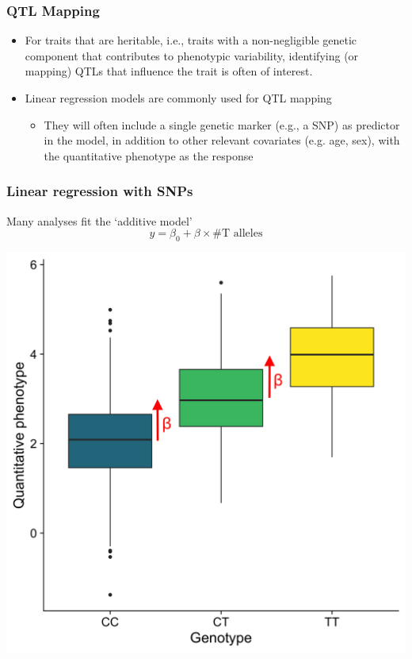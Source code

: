 \documentclass{beamer}
\begin{document}
\begin{frame}
	\frametitle{\bf  QTL Mapping}
	\begin{itemize}
		\item For traits that are heritable, i.e., traits with a non-negligible genetic component that contributes to phenotypic variability, identifying (or mapping) QTLs  that influence the trait is often of interest.
		\item Linear regression models are commonly used for QTL mapping

		\begin{itemize}
		\item They will often include a single genetic marker (e.g., a SNP) as predictor in the model, in addition to other relevant covariates (e.g. age, sex), with the quantitative phenotype as the response
	\end{itemize}

\end{itemize}
\end{frame}


\begin{frame}
	\frametitle{\bf Linear regression with SNPs}
	
	Many analyses fit the `additive model'
	\[
	y = \beta_0 + \beta\times\#\mbox{T alleles}
	\]
	
	\centerline{
		\includegraphics[scale=.08]{Figures/lm_add.png}
	}
	
\end{frame}
\end{document}
